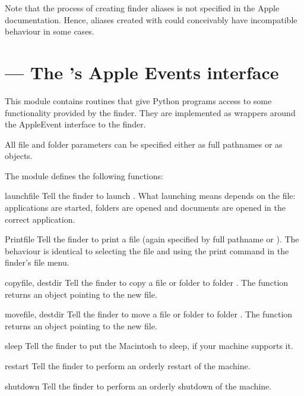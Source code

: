 Note that the process of creating finder aliases is not specified in
the Apple documentation. Hence, aliases created with 
could conceivably have incompatible behaviour in some cases.


\section{ ---
         The 's Apple Events interface}



This module contains routines that give Python programs access to some
functionality provided by the finder. They are implemented as wrappers
around the AppleEvent interface to the finder.

All file and folder parameters can be specified either as full
pathnames or as  objects.

The  module defines the following functions:


\begin{funcdesc}{launch}{file}
Tell the finder to launch . What launching means depends on the file:
applications are started, folders are opened and documents are opened
in the correct application.
\end{funcdesc}

\begin{funcdesc}{Print}{file}
Tell the finder to print a file (again specified by full pathname or
). The behaviour is identical to selecting the file and using
the print command in the finder's file menu.
\end{funcdesc}

\begin{funcdesc}{copy}{file, destdir}
Tell the finder to copy a file or folder  to folder
. The function returns an  object pointing to
the new file.
\end{funcdesc}

\begin{funcdesc}{move}{file, destdir}
Tell the finder to move a file or folder  to folder
. The function returns an  object pointing to
the new file.
\end{funcdesc}

\begin{funcdesc}{sleep}{}
Tell the finder to put the Macintosh to sleep, if your machine
supports it.
\end{funcdesc}

\begin{funcdesc}{restart}{}
Tell the finder to perform an orderly restart of the machine.
\end{funcdesc}

\begin{funcdesc}{shutdown}{}
Tell the finder to perform an orderly shutdown of the machine.
\end{funcdesc}
